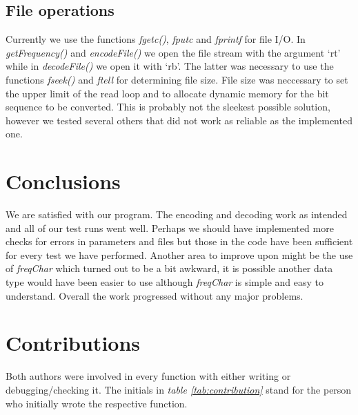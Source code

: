 \documentclass[a4paper,11pt,twoside]{article}
\begin{document}
\subsection{File operations}
Currently we use the functions \emph{fgetc()}, \emph{fputc} and
\emph{fprintf} for file I/O. In \emph{getFrequency()} and
\emph{encodeFile()} we open the file stream with the argument `rt'
while in \emph{decodeFile()} we open it with `rb'. The latter was
necessary to use the functions \emph{fseek()} and \emph{ftell} for
determining file size. File size was neccessary to set the upper 
limit of the read loop and to allocate dynamic memory
for the bit sequence to be converted. This is probably not the
sleekest possible solution, however we tested several others that 
did not work as reliable as the implemented one. 

\section{Conclusions}
We are satisfied with our program. The encoding and decoding work as
intended and all of our test runs went well. Perhaps we should have
implemented more checks for errors in parameters and files but those
in the code have been sufficient for every test we have
performed. Another area to improve upon might be the use of
\emph{freqChar} which turned out to be a bit awkward, it is possible
another data type would have been easier to use although
\emph{freqChar} is simple and easy to understand. Overall the work
progressed without any major problems. 

\section{Contributions}
Both authors were involved in every function with either writing or
debugging/checking it. The initials in \textit{table \ref{tab:contribution}}
stand for the person who initially wrote the respective function.
\end{document}
